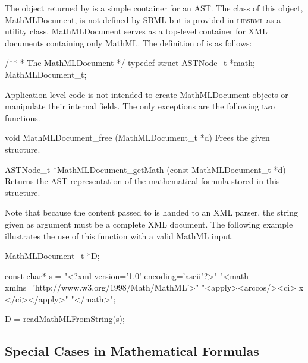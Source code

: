 \documentclass{cekmanual}
\newcommand{\libsbml}{\textsc{libsbml}}
\begin{document}
The object returned by  is a simple
container for an AST.  The class of this object, MathMLDocument, is not
defined by SBML but is provided in \libsbml{} as a utility class.
MathMLDocument serves as a top-level container for XML documents containing
only MathML.  The definition of  is as follows:
 
\begin{example}[c]
/**
 * The MathMLDocument
 */
typedef struct
{
  ASTNode_t *math;
} MathMLDocument_t;
\end{example}  

Application-level code is not intended to create MathMLDocument objects or
manipulate their internal fields.  The only exceptions are the following
two functions.

\begin{methoddef}{void MathMLDocument\_free (MathMLDocument\_t *d)}
  Frees the given  structure.
\end{methoddef}

\begin{methoddef}{ASTNode\_t *MathMLDocument\_getMath (const MathMLDocument\_t *d)}
  Returns the AST representation of the mathematical formula stored in this
   structure.
\end{methoddef}

Note that because the content passed to  is
handed to an XML parser, the string given as argument must be a complete
XML document.  The following example illustrates the use of this function
with a valid MathML input.

\begin{example}[c]
{
  MathMLDocument_t *D;

  const char* s = "<?xml version='1.0' encoding='ascii'?>"
                  "<math xmlns='http://www.w3.org/1998/Math/MathML'>"
                  "<apply><arccos/><ci> x </ci></apply>"
                  "</math>";

  D = readMathMLFromString(s);
}
\end{example}



\subsection{Special Cases in Mathematical Formulas}
\label{sec:mathml-math}
\end{document}
